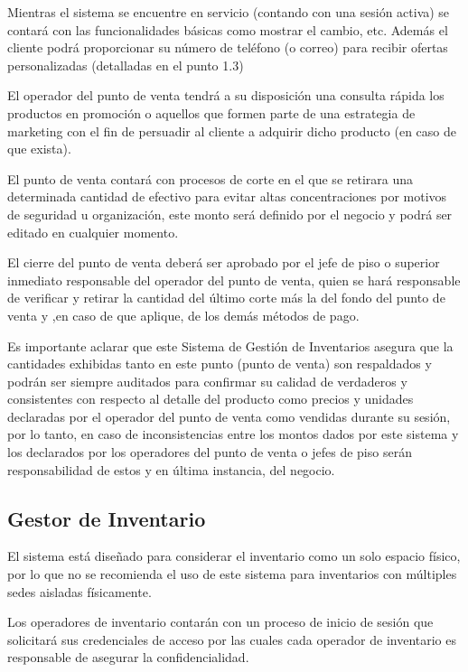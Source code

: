 \documentclass{article}
\begin{document}
Mientras el sistema se encuentre en servicio (contando con una sesión activa) se contará con las funcionalidades básicas como mostrar el cambio, etc. Además el cliente podrá proporcionar su número de teléfono (o correo) para recibir ofertas personalizadas (detalladas en el punto 1.3)

El operador del punto de venta tendrá a su disposición una consulta rápida los productos en promoción o aquellos que formen parte de una estrategia de marketing con el fin de persuadir al cliente a adquirir dicho producto (en caso de que exista).

El punto de venta contará con procesos de corte en el que se retirara una determinada cantidad de efectivo para evitar altas concentraciones por motivos de seguridad u organización, este monto será definido por el negocio y podrá ser editado en cualquier momento.

El cierre del punto de venta deberá ser aprobado por el jefe de piso o superior inmediato responsable del operador del punto de venta, quien se hará responsable de verificar y retirar la cantidad del último corte más la del fondo del punto de venta y ,en caso de que aplique, de los demás métodos de pago. 

Es importante aclarar que este Sistema de Gestión de Inventarios asegura que la cantidades exhibidas tanto en este punto (punto de venta) son respaldados y podrán ser siempre auditados para confirmar su calidad de verdaderos y consistentes con respecto al detalle del producto como precios y unidades declaradas por el operador del punto de venta como vendidas durante su sesión, por lo tanto, en caso de inconsistencias entre los montos dados por este sistema y los declarados por los operadores del punto de venta o jefes de piso serán responsabilidad de estos y en última instancia, del negocio.

\subsection{Gestor de Inventario}

El sistema está diseñado para considerar el inventario como un solo espacio físico, por lo que no se recomienda el uso de este sistema para inventarios con múltiples sedes aisladas físicamente. 

Los operadores de inventario contarán con un proceso de inicio de sesión que solicitará sus credenciales de acceso por las cuales cada operador de inventario es responsable de asegurar la confidencialidad.
\end{document}
